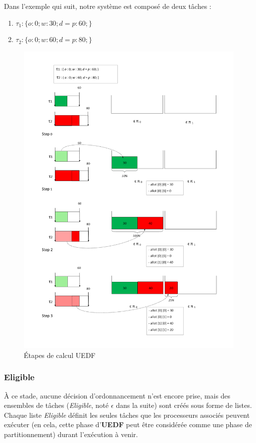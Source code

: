 	Dans l'exemple qui suit, notre système est composé de deux tâches :
	\begin{enumerate}
		\setlength\itemsep{0.1em}
		\item $\tau_1 : \{o:0; w:30; d=p:60;\}$
		\item $\tau_2 : \{o:0; w:60; d=p:80;\}$
	\end{enumerate}
	\begin{figure}[H]
		\includegraphics[scale=0.6]{img/uedf/croquisfonctionntSchedul}
		\caption{Étapes de calcul UEDF}
	\end{figure}
	\subsubsection{Eligible}
	À ce stade, aucune décision d'ordonnancement n'est encore prise, mais des ensembles de tâches (\textit{Eligible}, 
	noté $\epsilon$ dans la suite) sont créés sous forme de listes. Chaque liste \textit{Eligible} définit 
	les seules tâches que les processeurs associés peuvent exécuter (en cela, cette phase d'\textbf{UEDF} peut 
	être considérée comme une phase de partitionnement) durant l'exécution à venir.\newline
	
